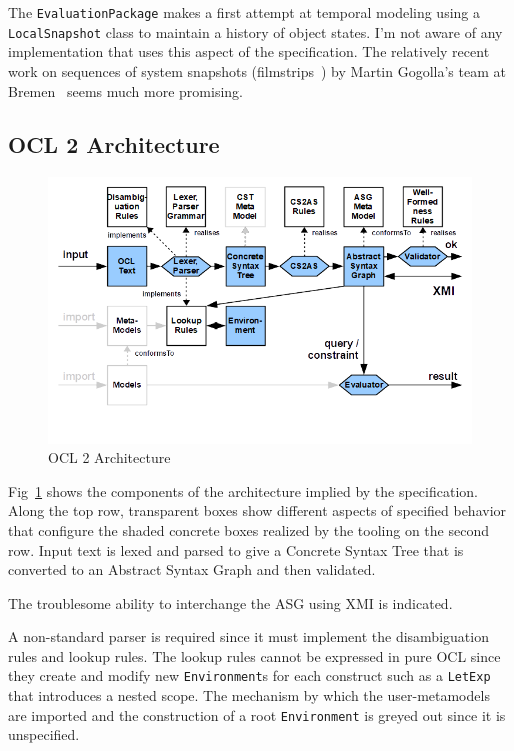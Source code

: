 \documentclass{jot}
\begin{document}
The \verb$EvaluationPackage$ makes a first attempt at temporal modeling using a \verb$LocalSnapshot$ class to maintain a history of object states. I'm not aware of any implementation that uses this aspect of the specification. The relatively recent work on sequences of system snapshots (filmstrips~\cite{Desai}) by Martin Gogolla's team at Bremen~\cite{USE} seems much more promising.

\subsection{OCL 2 Architecture}

\begin{figure}
	\begin{center}
		\includegraphics[width=4.5in]{OCL2Architecture.png}
	\end{center}
    \vspace{-40pt}
	\caption{OCL 2 Architecture}
	\label{fig:OCL2Architecture}
\end{figure}

Fig~\ref{fig:OCL2Architecture} shows the components of the architecture implied by the specification. Along the top row, transparent boxes show different aspects of specified behavior that configure the shaded concrete boxes realized by the tooling on the second row. Input text is lexed and parsed to give a Concrete Syntax Tree that is converted to an Abstract Syntax Graph and then validated.

The troublesome ability to interchange the ASG using XMI is indicated.

A non-standard parser is required since it must implement the disambiguation rules and lookup rules. The lookup rules cannot be expressed in pure OCL since they create and modify new \verb$Environment$s for each construct such as a \verb$LetExp$ that introduces a nested scope. The mechanism by which the user-metamodels are imported and the construction of a root \verb$Environment$ is greyed out since it is unspecified.
\end{document}
